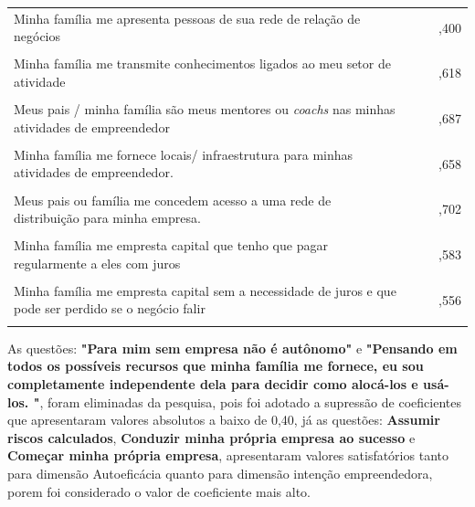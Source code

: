 \begin{longtable}[H]{p{6cm} c c c }
Minha família me apresenta pessoas de sua rede de relação de negócios
 &  & & ,400 \\\\
 
Minha família me transmite conhecimentos ligados ao meu setor de atividade
 &  & & ,618 \\\\
 
Meus pais / minha família são meus mentores ou \textit{coachs} nas minhas atividades de empreendedor
 &  & & ,687 \\\\
 
Minha família me fornece locais/ infraestrutura para minhas atividades de empreendedor.
 &  & & ,658 \\\\
 
Meus pais ou família me concedem acesso a uma rede de distribuição para minha empresa.
 &  & & ,702 \\\\
 
 
Minha família me empresta capital que  tenho que pagar regularmente a eles com juros		
 &  & & ,583 \\\\
 
Minha família me empresta capital sem a necessidade de juros e que pode ser perdido se o negócio falir
 & & & ,556 \\\\ \hline 
 
\end{longtable}

As questões: \textbf{"Para mim sem empresa não é autônomo"} e \textbf{"Pensando em todos os possíveis recursos que minha família me fornece, eu sou completamente independente dela para decidir como alocá-los e usá-los.			
"}, foram eliminadas da pesquisa, pois foi adotado a supressão de coeficientes que apresentaram valores absolutos a baixo de 0,40, já as questões: \textbf{Assumir riscos calculados}, \textbf{Conduzir minha própria empresa ao sucesso} e \textbf{Começar minha própria empresa}, apresentaram valores satisfatórios tanto para dimensão Autoeficácia quanto para dimensão intenção empreendedora, porem foi considerado o valor de coeficiente mais alto.


